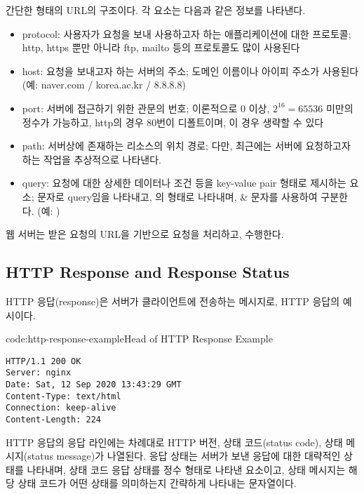     {}

\는 간단한 형태의 URL의 구조이다. 각 요소는 다음과 같은 정보를 나타낸다.

\begin{itemize}
    \item protocol: 사용자가 요청을 보내 사용하고자 하는 애플리케이션에 대한 프로토콜; http, https 뿐만 아니라 ftp, mailto 등의 프로토콜도 많이 사용된다
    \item host: 요청을 보내고자 하는 서버의 주소; 도메인 이름이나 아이피 주소가 사용된다 (예: naver.com / korea.ac.kr / 8.8.8.8)
    \item port: 서버에 접근하기 위한 관문의 번호; 이론적으로 0 이상, $2^{16}=65536$ 미만의 정수가 가능하고, http의 경우 80번이 디폴트이며, 이 경우 생략할 수 있다
    \item path: 서버상에 존재하는 리소스의 위치 경로; 다만, 최근에는 서버에 요청하고자 하는 작업을 추상적으로 나타낸다.
    \item query: 요청에 대한 상세한 데이터나 조건 등을 key-value pair 형태로 제시하는 요소;  문자로 query임을 나타내고, 의 형태로 나타내며, \cd\& 문자를 사용하여 구분한다. (예: )
\end{itemize}

웹 서버는 받은 요청의 URL을 기반으로 요청을 처리하고, 수행한다.

\subsection*{HTTP Response and Response Status}
HTTP 응답(response)은 서버가 클라이언트에 전송하는 메시지로, \은 HTTP 응답의 예시이다.

\begin{codeenv}{code:http-response-example}{Head of HTTP Response Example}\begin{verbatim}
HTTP/1.1 200 OK
Server: nginx
Date: Sat, 12 Sep 2020 13:43:29 GMT
Content-Type: text/html
Connection: keep-alive
Content-Length: 224
\end{verbatim}
\end{codeenv}

HTTP 응답의 응답 라인에는 차례대로 HTTP 버전, 상태 코드(status code), 상태 메시지(status message)가 나열된다. 응답 상태는 서버가 보낸 응답에 대한 대략적인 상태를 나타내며, 상태 코드 응답 상태를 정수 형태로 나타낸 요소이고, 상태 메시지는 해당 상태 코드가 어떤 상태를 의미하는지 간략하게 나타내는 문자열이다.

